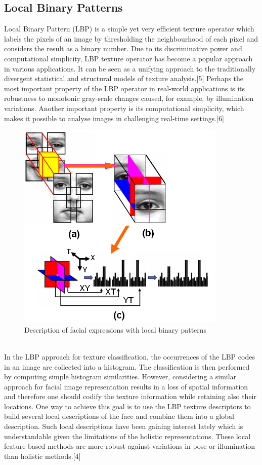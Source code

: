 \documentclass[12pt,a4paper]{article}
\begin{document}
\subsection*{Local Binary Patterns}
Local Binary Pattern (LBP) is a simple yet very efficient texture operator which labels the pixels of an image by thresholding the neighbourhood of each pixel and considers the result as a binary number. Due to its discriminative power and computational simplicity, LBP texture operator has become a popular approach in various applications. It can be seen as a unifying approach to the traditionally divergent statistical and structural models of texture analysis.[5] Perhaps the most important property of the LBP operator in real-world applications is its robustness to monotonic gray-scale changes caused, for example, by illumination variations. Another important property is its computational simplicity, which makes it possible to analyse images in challenging real-time settings.[6]\\
\begin{figure}[h!]
\centerline{\includegraphics[scale=0.55]{LBP_Main_Facial.jpg}}
\caption{Description of facial expressions with local binary patterns}
\label{fig 6}
\end{figure}
\\ 
In the LBP approach for texture classification, the occurrences of the LBP codes in an image are collected into a histogram. The classification is then performed by computing simple histogram similarities. However, considering a similar approach for facial image representation results in a loss of spatial information and therefore one should codify the texture information while retaining also their locations. One way to achieve this goal is to use the LBP texture descriptors to build several local descriptions of the face and combine them into a global description. Such local descriptions have been gaining interest lately which is understandable given the limitations of the holistic representations. These local feature based methods are more robust against variations in pose or illumination than holistic methods.[4]\\
\end{document}
